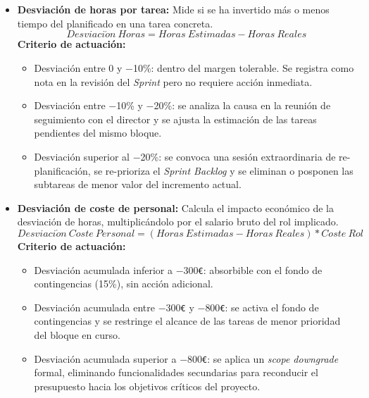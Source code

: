 \documentclass[11pt, letterpaper]{article}
\begin{document}
\begin{itemize}
    \item \textbf{Desviación de horas por tarea:} Mide si se ha invertido más o menos tiempo del planificado en una tarea concreta.
    \begin{equation}
        Desviaci\acute{o}n\ Horas = Horas\ Estimadas - Horas\ Reales
    \end{equation}
    \textbf{Criterio de actuación:}
    \begin{itemize}
        \item Desviación entre 0 y $-$10\%: dentro del margen tolerable. Se registra como nota en la revisión del \textit{Sprint} pero no requiere acción inmediata.
        \item Desviación entre $-$10\% y $-$20\%: se analiza la causa en la reunión de seguimiento con el director y se ajusta la estimación de las tareas pendientes del mismo bloque.
        \item Desviación superior al $-$20\%: se convoca una sesión extraordinaria de re-planificación, se re-prioriza el \textit{Sprint Backlog} y se eliminan o posponen las subtareas de menor valor del incremento actual.
    \end{itemize}

    \item \textbf{Desviación de coste de personal:} Calcula el impacto económico de la desviación de horas, multiplicándolo por el salario bruto del rol implicado.
    \begin{equation}
        Desviaci\acute{o}n\ Coste\ Personal = (Horas\ Estimadas - Horas\ Reales) * Coste\ Rol
    \end{equation}
    \textbf{Criterio de actuación:}
    \begin{itemize}
        \item Desviación acumulada inferior a $-$300\verb|€|: absorbible con el fondo de contingencias (15\%), sin acción adicional.
        \item Desviación acumulada entre $-$300\verb|€| y $-$800\verb|€|: se activa el fondo de contingencias y se restringe el alcance de las tareas de menor prioridad del bloque en curso.
        \item Desviación acumulada superior a $-$800\verb|€|: se aplica un \textit{scope downgrade} formal, eliminando funcionalidades secundarias para reconducir el presupuesto hacia los objetivos críticos del proyecto.
    \end{itemize}


\end{itemize}
\end{document}
